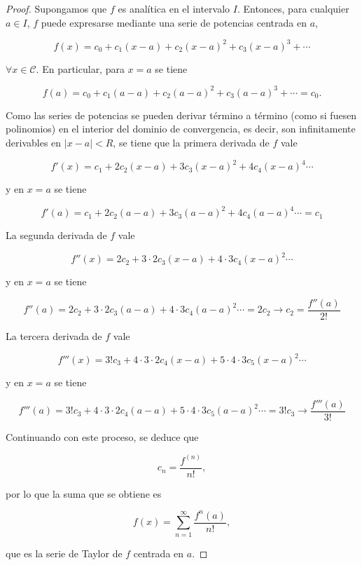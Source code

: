 \documentclass[
  a4paper,
]{scrreport}
\theoremstyle{plain}
\theoremstyle{plain}
\theoremstyle{definition}
\theoremstyle{plain}
\theoremstyle{definition}
\theoremstyle{remark}
\begin{document}
\begin{tcolorbox}[enhanced jigsaw, title=\textcolor{quarto-callout-note-color}{\faInfo}\hspace{0.5em}{Demostración}, opacityback=0, titlerule=0mm, colback=white, opacitybacktitle=0.6, colbacktitle=quarto-callout-note-color!10!white, breakable, left=2mm, bottomtitle=1mm, toptitle=1mm, coltitle=black, arc=.35mm, leftrule=.75mm, toprule=.15mm, rightrule=.15mm, bottomrule=.15mm, colframe=quarto-callout-note-color-frame]

\begin{proof}

Supongamos que \(f\) es analítica en el intervalo \(I\). Entonces, para
cualquier \(a\in I\), \(f\) puede expresarse mediante una serie de
potencias centrada en \(a\),

\[
f(x) = c_0 + c_1(x-a) + c_2(x-a)^2 + c_3(x-a)^3 + \cdots 
\]

\(\forall x\in\mathcal{C}\). En particular, para \(x=a\) se tiene

\[
f(a) = c_0 + c_1(a-a) + c_2(a-a)^2 + c_3(a-a)^3 + \cdots = c_0.
\]

Como las series de potencias se pueden derivar término a término (como
si fuesen polinomios) en el interior del dominio de convergencia, es
decir, son infinitamente derivables en \(|x−a|<R\), se tiene que la
primera derivada de \(f\) vale

\[
f'(x) = c_1 + 2c_2(x-a) + 3c_3(x-a)^2 + 4c_4(x-a)^4 \cdots
\]

y en \(x=a\) se tiene

\[
f'(a) = c_1 + 2c_2(a-a) + 3c_3(a-a)^2 + 4c_4(a-a)^4 \cdots = c_1
\]

La segunda derivada de \(f\) vale

\[
f''(x) = 2c_2 + 3\cdot 2 c_3(x-a) + 4\cdot 3c_4(x-a)^2 \cdots
\]

y en \(x=a\) se tiene

\[
f''(a) = 2c_2 + 3\cdot 2 c_3(a-a) + 4\cdot 3c_4(a-a)^2 \cdots = 2c_2 \rightarrow c_2 = \frac{f''(a)}{2!}
\]

La tercera derivada de \(f\) vale

\[
f'''(x) = 3!c_3 + 4\cdot 3\cdot 2c_4(x-a)+ 5\cdot 4\cdot 3c_5(x-a)^2 \cdots
\]

y en \(x=a\) se tiene

\[
f'''(a) = 3!c_3 + 4\cdot 3\cdot 2c_4(a-a)+ 5\cdot 4\cdot 3c_5(a-a)^2 \cdots = 3!c_3 \rightarrow \frac{f'''(a)}{3!}
\]

Continuando con este proceso, se deduce que

\[
c_n = \frac{f^{(n)}}{n!},
\]

por lo que la suma que se obtiene es

\[
f(x) = \sum_{n=1}^\infty \frac{f^{n}(a)}{n!},
\]

que es la serie de Taylor de \(f\) centrada en \(a\).

\end{proof}

\end{tcolorbox}
\end{document}
